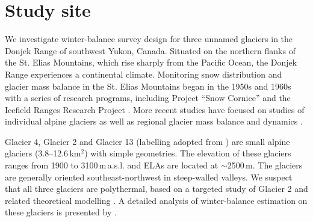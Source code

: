 \documentclass{article}
\begin{document}

\section{Study site}

We investigate winter-balance survey design for three unnamed glaciers in the Donjek Range of southwest Yukon, Canada. Situated on the northern flanks of the St. Elias Mountains, which rise sharply from the Pacific Ocean, the Donjek Range experiences a continental climate. Monitoring snow distribution and glacier mass balance in the St. Elias Mountains began in the 1950s and 1960s with a series of research programs, including Project ``Snow Cornice''  and the Icefield Ranges Research Project \citep{Wood1948, Danby2003}. More recent studies have focused on studies of individual alpine glaciers \citep[e.g.][]{Clarke2014,Flowers2014} as well as regional glacier mass balance and dynamics \citep[e.g.][]{Arendt2008, Burgess2013,Waechter2015}. 

Glacier 4, Glacier 2 and Glacier 13 (labelling adopted from \cite{Crompton2016}) are small alpine glaciers (3.8--12.6\,km$^2$) with simple geometries. The elevation of these glaciers ranges from 1900 to 3100\,m\,a.s.l. and ELAs are located at $\sim$2500\,m. The glaciers are generally oriented southeast-northwest in steep-walled valleys. We suspect that all three glaciers are polythermal, based on a targeted study of Glacier 2 \citep{Wilson2013} and related theoretical modelling \citep{Wilson2013a}. A detailed analysis of winter-balance estimation on these glaciers is presented by \cite{Pulwicki2017}.
\end{document}
